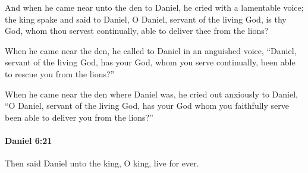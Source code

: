 			\begin{versebox}
					\item[BHS] 
					\item[LXX] 
					\item[ASV] And when he came near unto the den to Daniel, he cried with a lamentable voice; the king spake and said to Daniel, O Daniel, servant of the living God, is thy God, whom thou servest continually, able to deliver thee from the lions?
					\item[NIV] When he came near the den, he called to Daniel in an anguished voice, “Daniel, servant of the living God, has your God, whom you serve continually, been able to rescue you from the lions?”
					\item[NRSV] When he came near the den where Daniel was, he cried out anxiously to Daniel, “O Daniel, servant of the living God, has your God whom you faithfully serve been able to deliver you from the lions?”
			\end{versebox}

		\paragraph{Daniel 6:21} %
			\label{DANIEL-6-21}

			Then said Daniel unto the king, O king, live for ever.

